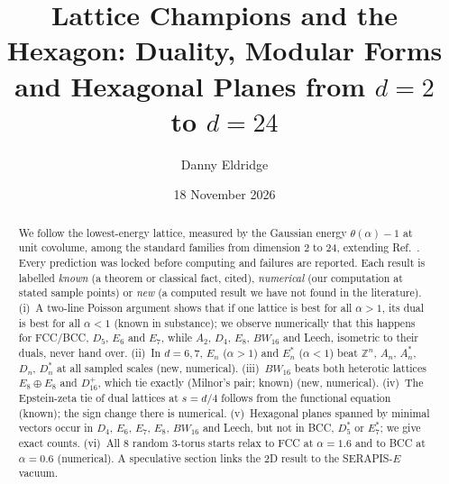 \documentclass[aps,prd,twocolumn,superscriptaddress,nofootinbib,showkeys]{revtex4-2}
\begin{document}
\title{Lattice Champions and the Hexagon: Duality, Modular Forms and Hexagonal Planes from $d=2$ to $d=24$}
\author{Danny Eldridge}
\date{18 November 2026}
\begin{abstract}
We follow the lowest-energy lattice, measured by the Gaussian energy $\theta(\alpha)-1$ at unit covolume, among the standard families from dimension 2 to 24, extending Ref.~\cite{P6}. Every prediction was locked before computing and failures are reported. Each result is labelled \emph{known} (a theorem or classical fact, cited), \emph{numerical} (our computation at stated sample points) or \emph{new} (a computed result we have not found in the literature). (i)~A two-line Poisson argument shows that if one lattice is best for all $\alpha>1$, its dual is best for all $\alpha<1$ (known in substance); we observe numerically that this happens for FCC/BCC, $D_5$, $E_6$ and $E_7$, while $A_2$, $D_4$, $E_8$, $BW_{16}$ and Leech, isometric to their duals, never hand over. (ii)~In $d=6,7$, $E_n$ ($\alpha>1$) and $E_n^*$ ($\alpha<1$) beat $\mathbb Z^n$, $A_n$, $A_n^*$, $D_n$, $D_n^*$ at all sampled scales (new, numerical). (iii)~$BW_{16}$ beats both heterotic lattices $E_8\oplus E_8$ and $D_{16}^+$, which tie exactly (Milnor's pair; known) (new, numerical). (iv)~The Epstein-zeta tie of dual lattices at $s=d/4$ follows from the functional equation (known); the sign change there is numerical. (v)~Hexagonal planes spanned by minimal vectors occur in $D_4$, $E_6$, $E_7$, $E_8$, $BW_{16}$ and Leech, but not in BCC, $D_5^*$ or $E_7^*$; we give exact counts. (vi)~All 8 random 3-torus starts relax to FCC at $\alpha=1.6$ and to BCC at $\alpha=0.6$ (numerical). A speculative section links the 2D result to the SERAPIS-$E$ vacuum.
\end{abstract}
\maketitle
\end{document}
